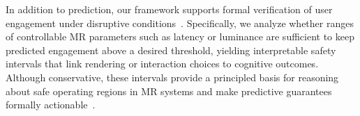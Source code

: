 \documentclass[review]{vgtc}                 %
\begin{document}


In addition to prediction, our framework supports formal verification of user engagement under disruptive conditions~\cite{10.1007/978-3-031-60698-4_19}. Specifically, we analyze whether ranges of controllable MR parameters such as latency or luminance are sufficient to keep predicted engagement above a desired threshold, yielding interpretable safety intervals that link rendering or interaction choices to cognitive outcomes. Although conservative, these intervals provide a principled basis for reasoning about safe operating regions in MR systems and make predictive guarantees formally actionable~\cite{10.1007/978-3-031-60698-4_19,hobbs2023runtime}.
\end{document}
